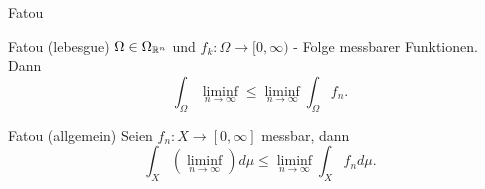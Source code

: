 \documentclass[class=article, crop=false]{standalone}
\begin{document}
\begin{zettel}{Fatou}
\begin{flashcard}[6fu9ltsq]{Fatou (lebesgue)}
	$\Omega \in \Omega_{\mathbb{R}^n}$ und $f_k : \Omega \to  [0, \infty)$ - Folge messbarer Funktionen. Dann
	\[
		\int_{\Omega} \liminf_{n \to \infty} \leq \liminf_{n \to  \infty} \int_{\Omega} f_n
	.\]
\end{flashcard}

\begin{flashcard}[wlffh9if]{Fatou (allgemein)}
	Seien $f_n : X \to  [0,\infty]$ messbar, dann
	\[
		\int_{X} \left(\liminf_{n \to \infty}\right) d\mu \leq \liminf_{n \to  \infty} \int_{X} f_n d\mu
	.\]
\end{flashcard}
\end{zettel}
\end{document}
